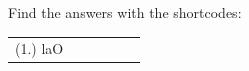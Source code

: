       
    
  \label{m39368**end}
          
       
    
  \label{8eb3a75df362978731c03bbeab266515**end}
    
\par {} Find the answers with the shortcodes:
 \par \begin{tabular}[h]{cccccc}
 (1.) laO  & \end{tabular}



